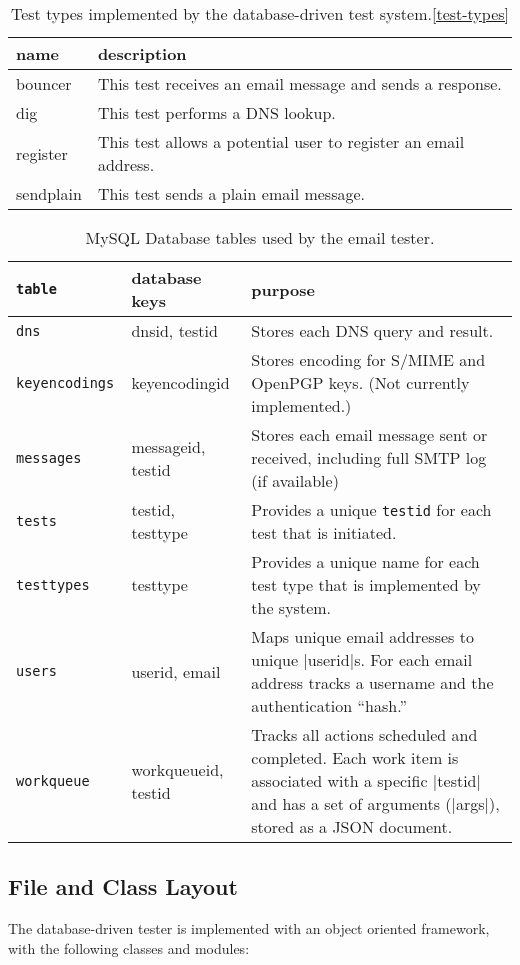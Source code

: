 \documentclass[preprint,3p,11pt]{elsarticle}
\begin{document}
\begin{table}
\begin{center}
\begin{tabularx}{\linewidth}{lX}
\hline
name & description \\
\hline
bouncer   & This test receives an email message and sends a response. \\
dig       & This test performs a DNS lookup.\\
register  & This test allows a potential user to register an email address. \\
sendplain & This test sends a plain email message.\\
\hline
\end{tabularx}
\end{center}
\caption{Test types implemented by the database-driven test system.\ref{test-types}}
\end{table}


\begin{table}
\begin{tabular}{|>{\tt}llp{4in}|}
\hline
\textrm{table} & database keys & purpose \\
\hline
dns & dnsid, testid & Stores each DNS query and result. \\
keyencodings & keyencodingid & Stores encoding for S/MIME and OpenPGP keys. (Not currently implemented.) \\
messages & messageid, testid & Stores each email message sent or received, including full SMTP log (if available) \\
tests & testid, testtype & Provides a unique \texttt{testid} for each test that is initiated.\\
testtypes & testtype & Provides a unique name for each test type that is implemented by the system.\\
users & userid, email & Maps unique email addresses to unique |userid|s. For each email address tracks a username and the authentication ``hash.''\\
workqueue & workqueueid, testid & Tracks all actions scheduled and completed. Each work item is associated with a specific |testid| and has a set of arguments (|args|), stored as a JSON document.\\
\hline
\end{tabular}
\caption{MySQL Database tables used by the email tester.}\label{db}
\end{table}

\subsection{File and Class Layout}
The database-driven tester is implemented with an object oriented
framework, with the following classes and modules:
\end{document}
